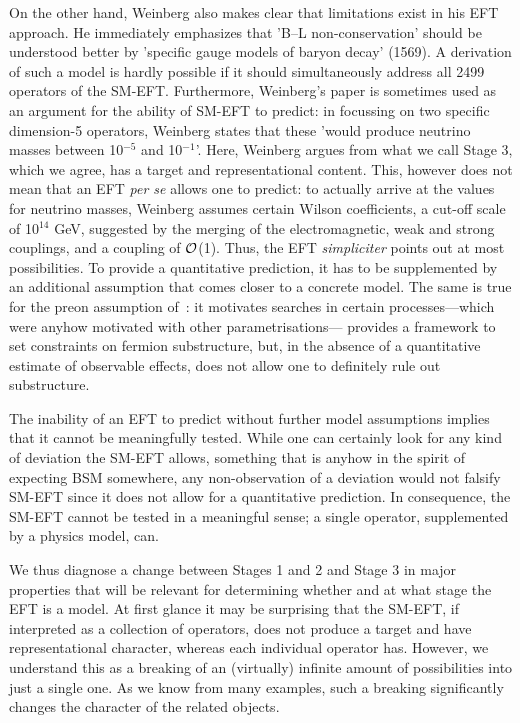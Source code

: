 On the other hand, Weinberg also makes clear that limitations exist in his EFT approach. 
He immediately emphasizes that
'B--L non-conservation' should be understood better by 'specific gauge models of
baryon decay' (1569).
A derivation of such a model is hardly possible if it should simultaneously address all 2499 operators
of the SM-EFT.
Furthermore, Weinberg's paper is sometimes used as an argument for the ability of 
SM-EFT to predict:
in focussing on two specific dimension-5 operators, Weinberg states that these 
'would produce neutrino masses between 10$^{-5}$ and 10$^{-1}$'.
Here, Weinberg argues from what we call Stage 3, which we agree, has a target
and representational content.
This, however does not mean that an EFT \textit{per se} allows one to predict:
to actually arrive at the values for neutrino masses,
Weinberg assumes certain Wilson coefficients, a cut-off scale of 
10$^{14}$ GeV, suggested by the merging of the electromagnetic, weak and strong couplings, 
and a coupling of $\cal{O}$(1).
Thus, the EFT \textit{simpliciter} points out at most possibilities. 
To provide a quantitative prediction, it has to be supplemented by an additional assumption 
that comes closer to a concrete model.
The same is true for the preon assumption of~\cite{Eichten:1983hw}: it motivates searches
in certain processes---which were anyhow motivated with other parametrisations---
provides a framework to set constraints on fermion substructure, but, in the absence of a quantitative
estimate of observable effects, does not allow one to definitely rule out substructure. 

The inability of an EFT to predict without further model assumptions implies that it
cannot be meaningfully tested.
While one can certainly look for any kind of deviation the SM-EFT allows, something
that is anyhow in the spirit of expecting BSM somewhere,
any non-observation of a deviation would not falsify SM-EFT since it does not
allow for a quantitative prediction.  
In consequence, the SM-EFT cannot be tested in a meaningful sense; 
a single operator, supplemented by a physics model, can. 

We thus diagnose a change between Stages 1 and 2 and Stage 3 
in major properties that will be relevant for determining whether and at what stage the EFT is a model. 
At first glance it may be surprising that the SM-EFT, if interpreted as a collection of operators,
does not produce a target and have representational character,
whereas each individual operator has.
However, we understand this as a breaking of an (virtually) infinite amount of possibilities
into just a single one.
As we know from many examples, such a breaking significantly changes the character of 
the related objects. 
  
